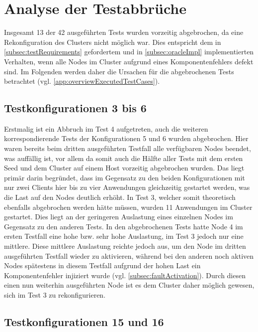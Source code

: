 \section{Analyse der Testabbrüche}
\label{sec:noReconfig}

Insgesamt 13 der 42 ausgeführten Tests wurden vorzeitig abgebrochen, da eine Rekonfiguration des Clusters nicht möglich war.
Dies entspricht dem in \cref{subsec:testRequirements} gefordertem und in \cref{subsec:oracleImpl} implementierten Verhalten, wenn alle Nodes im Cluster aufgrund eines Komponentenfehlers defekt sind.
Im Folgenden werden daher die Ursachen für die abgebrochenen Tests betrachtet (vgl. \cref{app:overviewExecutedTestCases}).

\subsection{Testkonfigurationen 3 bis 6}
\label{subsec:noReconf36}

Erstmalig ist ein Abbruch im Test 4 aufgetreten, auch die weiteren korrespondierende Tests der Konfigurationen 5 und 6 wurden abgebrochen.
Hier waren bereits beim dritten ausgeführten Testfall alle verfügbaren Nodes beendet, was auffällig ist, vor allem da somit auch die Hälfte aller Tests mit dem ersten Seed und dem Cluster auf einem Host vorzeitig abgebrochen wurden.
Das liegt primär darin begründet, dass im Gegensatz zu den beiden Konfigurationen mit nur zwei Clients hier bis zu vier Anwendungen gleichzeitig gestartet werden, was die Last auf den Nodes deutlich erhöht.
In Test 3, welcher somit theoretisch ebenfalls abgebrochen werden hätte müssen, wurden 11 Anwendungen im Cluster gestartet.
Dies liegt an der geringeren Auslastung eines einzelnen Nodes im Gegensatz zu den anderen Tests.
In den abgebrochenen Tests hatte Node 4 im ersten Testfall eine hohe bzw. sehr hohe Auslastung, im Test 3 jedoch nur eine mittlere.
Diese mittlere Auslastung reichte jedoch aus, um den Node im dritten ausgeführten Testfall wieder zu aktivieren, während bei den anderen noch aktiven Nodes spätestens in diesem Testfall aufgrund der hohen Last ein Komponentenfehler injiziert wurde (vgl. \cref{subsec:faultActivation}).
Durch diesen einen nun weiterhin ausgeführten Node ist es dem Cluster daher möglich gewesen, sich im Test 3 zu rekonfigurieren.

\subsection{Testkonfigurationen 15 und 16}
\label{subsec:noReconf1516}

